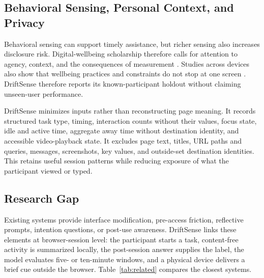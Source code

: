 \documentclass[12pt,a4paper]{article}
\newcommand{\citep}[1]{\parencite{#1}}
\begin{document}
\subsection{Behavioral Sensing, Personal Context, and Privacy}

Behavioral sensing can support timely assistance, but richer sensing also increases disclosure risk. Digital-wellbeing scholarship therefore calls for attention to agency, context, and the consequences of measurement \citep{burr2020ethics,buchi2021digital}. Studies across devices also show that wellbeing practices and constraints do not stop at one screen \citep{roffarello2021multidevice}. DriftSense therefore reports its known-participant holdout without claiming unseen-user performance.

DriftSense minimizes inputs rather than reconstructing page meaning. It records structured task type, timing, interaction counts without their values, focus state, idle and active time, aggregate away time without destination identity, and accessible video-playback state. It excludes page text, titles, URL paths and queries, messages, screenshots, key values, and outside-set destination identities. This retains useful session patterns while reducing exposure of what the participant viewed or typed.

\subsection{Research Gap}

Existing systems provide interface modification, pre-access friction, reflective prompts, intention questions, or post-use awareness. DriftSense links these elements at browser-session level: the participant starts a task, content-free activity is summarized locally, the post-session answer supplies the label, the model evaluates five- or ten-minute windows, and a physical device delivers a brief cue outside the browser. Table~\ref{tab:related} compares the closest systems.
\end{document}
